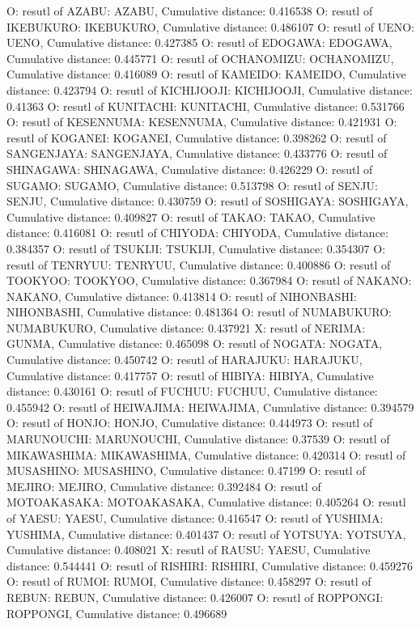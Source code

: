 O: resutl of AZABU: AZABU, Cumulative distance: 0.416538
O: resutl of IKEBUKURO: IKEBUKURO, Cumulative distance: 0.486107
O: resutl of UENO: UENO, Cumulative distance: 0.427385
O: resutl of EDOGAWA: EDOGAWA, Cumulative distance: 0.445771
O: resutl of OCHANOMIZU: OCHANOMIZU, Cumulative distance: 0.416089
O: resutl of KAMEIDO: KAMEIDO, Cumulative distance: 0.423794
O: resutl of KICHIJOOJI: KICHIJOOJI, Cumulative distance: 0.41363
O: resutl of KUNITACHI: KUNITACHI, Cumulative distance: 0.531766
O: resutl of KESENNUMA: KESENNUMA, Cumulative distance: 0.421931
O: resutl of KOGANEI: KOGANEI, Cumulative distance: 0.398262
O: resutl of SANGENJAYA: SANGENJAYA, Cumulative distance: 0.433776
O: resutl of SHINAGAWA: SHINAGAWA, Cumulative distance: 0.426229
O: resutl of SUGAMO: SUGAMO, Cumulative distance: 0.513798
O: resutl of SENJU: SENJU, Cumulative distance: 0.430759
O: resutl of SOSHIGAYA: SOSHIGAYA, Cumulative distance: 0.409827
O: resutl of TAKAO: TAKAO, Cumulative distance: 0.416081
O: resutl of CHIYODA: CHIYODA, Cumulative distance: 0.384357
O: resutl of TSUKIJI: TSUKIJI, Cumulative distance: 0.354307
O: resutl of TENRYUU: TENRYUU, Cumulative distance: 0.400886
O: resutl of TOOKYOO: TOOKYOO, Cumulative distance: 0.367984
O: resutl of NAKANO: NAKANO, Cumulative distance: 0.413814
O: resutl of NIHONBASHI: NIHONBASHI, Cumulative distance: 0.481364
O: resutl of NUMABUKURO: NUMABUKURO, Cumulative distance: 0.437921
X: resutl of NERIMA: GUNMA, Cumulative distance: 0.465098
O: resutl of NOGATA: NOGATA, Cumulative distance: 0.450742
O: resutl of HARAJUKU: HARAJUKU, Cumulative distance: 0.417757
O: resutl of HIBIYA: HIBIYA, Cumulative distance: 0.430161
O: resutl of FUCHUU: FUCHUU, Cumulative distance: 0.455942
O: resutl of HEIWAJIMA: HEIWAJIMA, Cumulative distance: 0.394579
O: resutl of HONJO: HONJO, Cumulative distance: 0.444973
O: resutl of MARUNOUCHI: MARUNOUCHI, Cumulative distance: 0.37539
O: resutl of MIKAWASHIMA: MIKAWASHIMA, Cumulative distance: 0.420314
O: resutl of MUSASHINO: MUSASHINO, Cumulative distance: 0.47199
O: resutl of MEJIRO: MEJIRO, Cumulative distance: 0.392484
O: resutl of MOTOAKASAKA: MOTOAKASAKA, Cumulative distance: 0.405264
O: resutl of YAESU: YAESU, Cumulative distance: 0.416547
O: resutl of YUSHIMA: YUSHIMA, Cumulative distance: 0.401437
O: resutl of YOTSUYA: YOTSUYA, Cumulative distance: 0.408021
X: resutl of RAUSU: YAESU, Cumulative distance: 0.544441
O: resutl of RISHIRI: RISHIRI, Cumulative distance: 0.459276
O: resutl of RUMOI: RUMOI, Cumulative distance: 0.458297
O: resutl of REBUN: REBUN, Cumulative distance: 0.426007
O: resutl of ROPPONGI: ROPPONGI, Cumulative distance: 0.496689
